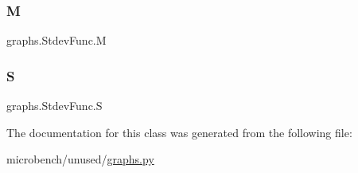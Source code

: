 \mbox{\label{classgraphs_1_1StdevFunc_a2dd9047d6c2873699b2f0ca605690b9c}} 
\subsubsection{\texorpdfstring{M}{M}}
{\footnotesize\ttfamily graphs.\+Stdev\+Func.\+M}

\mbox{\label{classgraphs_1_1StdevFunc_ac8455ae1705af7de00108c76e6b9b439}} 
\subsubsection{\texorpdfstring{S}{S}}
{\footnotesize\ttfamily graphs.\+Stdev\+Func.\+S}



The documentation for this class was generated from the following file\+:\begin{DoxyCompactItemize}
\item 
microbench/unused/\hyperlink{graphs_8py}{graphs.\+py}\end{DoxyCompactItemize}
